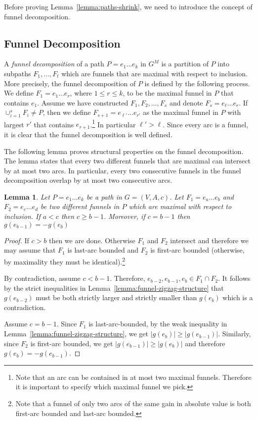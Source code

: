 \documentclass[11pt]{article}
\newtheorem{lemma}[theorem]{Lemma}
\begin{document}
Before proving Lemma~\ref{lemma:paths-shrink}, we need to introduce the concept of funnel decomposition.

\subsection{Funnel Decomposition}
 A \emph{funnel decomposition} of a path $P=e_1\ldots e_k$ in $G^M$ is a partition of $P$ into subpaths $F_1,\ldots,F_t$ which are funnels that are maximal with respect to inclusion. More precisely, the funnel decomposition of $P$ is defined by the following process. We define $F_1 = e_1 \ldots e_r$, where $1\le r\le k$, to be the maximal funnel in $P$ that contains $e_1$. Assume we have constructed $F_1,F_2,\ldots, F_s$ and denote $F_s = e_{\ell} \ldots e_r$. If $\cup_{i=1}^s F_i \neq P$, then we define $F_{s+1}= e_{\ell'}\ldots e_{r'}$ as the maximal funnel in $P$ with largest $r'$ that contains $e_{r+1}$.\footnote{Note that an arc can be contained in at most two maximal funnels. Therefore it is important to specify which maximal funnel we pick.} In particular $\ell'>\ell$. Since every arc is a funnel, it is clear that the funnel decomposition is well defined. 
 

The following lemma proves structural properties on the funnel decomposition.
The lemma states that every two different funnels that are maximal can intersect by at most two arcs. In particular, every two consecutive funnels in the funnel decomposition overlap by at most two consecutive arcs.

\begin{lemma}\label{lemma:funnel-intersection}
    Let $P= e_1 \ldots e_k$ be a path in $G=(V,A,c)$. Let $F_1= e_a\ldots e_b$ and $F_2=e_c \ldots e_d$ be two different funnels in $P$ which are maximal with respect to inclusion. If $a<c$ then $c\ge b-1$. Moreover, if $c=b-1$ then $g(e_{b-1})=-g(e_{b})$
\end{lemma}

\begin{proof}
    If $c>b$ then we are done. 
    Otherwise $F_1$ and $F_2$ intersect and  therefore we may assume that 
    $F_1$ is last-arc bounded and $F_2$ is first-arc bounded (otherwise, by maximality they must be identical).\footnote{Note that a funnel of only two arcs of the same gain in absolute value is both first-arc bounded  and  last-arc bounded.}
    
    By contradiction, assume $c< b-1$. Therefore, $e_{b-2},e_{b-1},e_b \in F_1 \cap F_2$. It follows by the strict inequalities in Lemma~\ref{lemma:funnel-zigzag-structure} that $g(e_{b-2})$ must be both strictly larger and strictly smaller than   $g(e_{b})$
 which is a contradiction.

    Assume $c=b-1$.  Since $F_1$ is last-arc-bounded, by the weak  inequality  in Lemma~\ref{lemma:funnel-zigzag-structure}, we get $|g(e_{b})| \ge |g(e_{b-1})|$. Similarly, since $F_2$ is first-arc bounded, we get $|g(e_{b-1})| \ge |g(e_{b})|$ and therefore $g(e_{b}) = -g(e_{b-1})$.
\end{proof}
\end{document}
